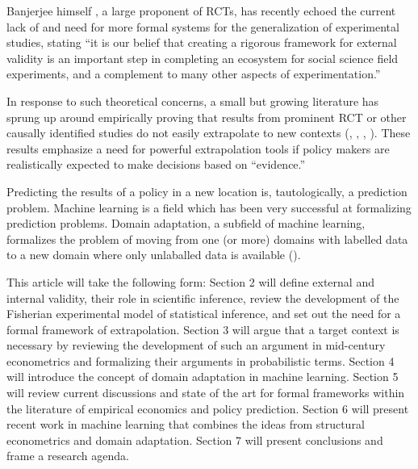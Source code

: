 \documentclass[a4paper,12pt]{article}
\begin{document}
Banjerjee himself \parencite{Snowberg2016}, a large proponent of RCTs, has recently echoed the current lack of and need for more formal systems for the generalization of experimental studies, stating ``it is our belief that creating a rigorous framework for external validity is an important step in completing an ecosystem for social science field experiments, and a complement to many other aspects of experimentation.''

In response to such theoretical concerns, a small but growing literature  has sprung up around empirically proving that results from prominent RCT or other causally identified studies do not easily extrapolate to new contexts (\cite{Pritchett2016}, \cite{Allcott2015}, \cite{Bisbee2017}, \cite{Rosenzweig2019}). These results emphasize a need for powerful extrapolation tools if policy makers are realistically expected to make decisions based on ``evidence.'' 

Predicting the results of a policy in a new location is, tautologically, a prediction problem. Machine learning is a field which has been very successful at formalizing prediction problems. Domain adaptation, a subfield of machine learning, formalizes the problem of moving from one (or more) domains with labelled data to a new domain where only unlaballed data is available (\cite[for a survey, see][]{Pan2010}).

This article will take the following form: Section 2 will define external and internal validity, their role in scientific inference, review the development of the Fisherian experimental model of statistical inference, and set out the need for a formal framework of extrapolation. Section 3 will argue that a target context is necessary by reviewing the development of such an argument in mid-century econometrics and formalizing their arguments in probabilistic terms. Section 4 will introduce the concept of domain adaptation in machine learning. Section 5 will review current discussions and state of the art for formal frameworks within the literature of empirical economics and policy prediction. Section 6 will present recent work in machine learning that combines the ideas from structural econometrics and domain adaptation. Section 7 will present conclusions and frame a research agenda. 


\end{document}
